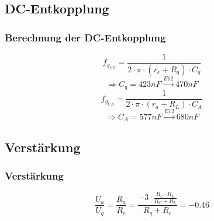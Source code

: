 \subsection{DC-Entkopplung}
\begin{frame}
	\frametitle{Berechnung der DC-Entkopplung}
	\[ f_{g_{UE}} = \frac{1}{2 \cdot \pi \cdot (r_e + R_q) \cdot C_q} \]
	\[ \Rightarrow C_q = 423nF \xrightarrow{E12} 470nF \]
	\[ f_{g_{UA}} = \frac{1}{2 \cdot \pi \cdot (r_a + R_L) \cdot C_A} \]
	\[ \Rightarrow C_A = 577nF \xrightarrow{E12} 680nF \]
\end{frame}

\subsection{Verstärkung}
\begin{frame}
	\frametitle{Verstärkung}
	\[ \frac{U_a}{U_q} = \frac{R_a}{R_e} = 
		\frac{-3 \cdot \frac{R_C \cdot R_L}{R_C + R_L}}{R_q + R_e} 
		= -0.46 \]
\end{frame}

